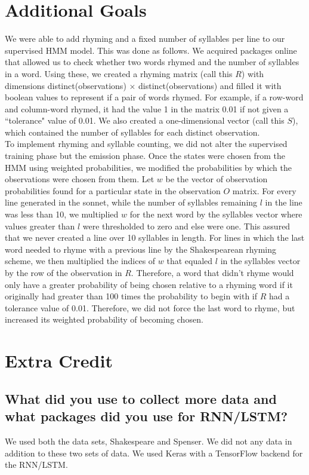 \section{Additional Goals}
\medskip
We were able to add rhyming and a fixed number of syllables per line to our supervised HMM model. This was done as follows. We acquired packages online that allowed us to check whether two words rhymed and the number of syllables in a word. Using these, we created a rhyming matrix (call this $R$) with dimensions distinct(observations) $\times$ distinct(observations) and filled it with boolean values to represent if a pair of words rhymed. For example, if a row-word and column-word rhymed, it had the value 1 in the matrix 0.01 if not given a ``tolerance" value of 0.01. We also created a one-dimensional vector (call this $S$), which contained the number of syllables for each distinct observation.\\
\indent To implement rhyming and syllable counting, we did not alter the supervised training phase but the emission phase. Once the states were chosen from the HMM using weighted probabilities, we modified the probabilities by which the observations were chosen from them. Let $w$ be the vector of observation probabilities found for a particular state in the observation $O$ matrix. For every line generated in the sonnet, while the number of syllables remaining $l$ in the line was less than 10, we multiplied $w$ for the next word by the syllables vector where values greater than $l$ were thresholded to zero and else were one. This assured that we never created a line over 10 syllables in length. For lines in which the last word needed to rhyme with a previous line by the Shakespearean rhyming scheme, we then multiplied the indices of $w$ that equaled $l$ in the syllables vector by the row of the observation in $R$. Therefore, a word that didn't rhyme would only have a greater probability of being chosen relative to a rhyming word if it originally had greater than 100 times the probability to begin with if $R$ had a tolerance value of 0.01. Therefore, we did not force the last word to rhyme, but increased its weighted probability of becoming chosen.


\section{Extra Credit}
\medskip

\subsection{What did you use to collect more data and what packages did you use for RNN/LSTM?}
We used both the data sets, Shakespeare and Spenser. We did not any data in addition to these two sets of data. We used Keras with a TensorFlow backend for the RNN/LSTM.
